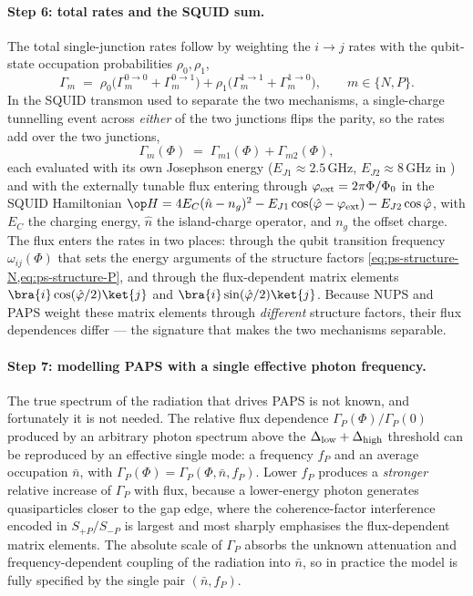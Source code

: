 \paragraph{Step 6: total rates and the SQUID sum.}
The total single-junction rates follow by weighting the $i\to j$
rates with the qubit-state occupation probabilities
$\rho_0,\rho_1$,
\begin{equation}
\label{eq:ps-total-single}
\Gamma_m \;=\; \rho_0\bigl(\Gamma_m^{0\to0}+\Gamma_m^{0\to1}\bigr)
+ \rho_1\bigl(\Gamma_m^{1\to1}+\Gamma_m^{1\to0}\bigr),
\qquad m\in\{N,P\}.
\end{equation}
In the SQUID transmon used to separate the two mechanisms, a
single-charge tunnelling event across \emph{either} of the two
junctions flips the parity, so the rates add over the two
junctions,
\begin{equation}
\label{eq:ps-squid-sum}
\Gamma_m(\Phi) \;=\; \Gamma_{m1}(\Phi) + \Gamma_{m2}(\Phi),
\end{equation}
each evaluated with its own Josephson energy
($E_{J1}\approx 2.5\,\text{GHz}$, $E_{J2}\approx 8\,\text{GHz}$ in
\cite{diamond2022}) and with the externally tunable flux entering
through $\varphi_{\rm ext}=2\pi\Phi/\Phi_0$ in the SQUID
Hamiltonian
$\op H = 4E_C(\hat n - n_g)^2 - E_{J1}\cos(\hat\varphi-\varphi_{\rm ext})
- E_{J2}\cos\hat\varphi$, with $E_C$ the charging energy, $\hat n$
the island-charge operator, and $n_g$ the offset charge. The flux
enters the rates in two places: through the qubit transition
frequency $\omega_{ij}(\Phi)$ that sets the energy arguments of the
structure factors
\cref{eq:ps-structure-N,eq:ps-structure-P}, and through the
flux-dependent matrix elements
$\bra{i}\cos(\hat\varphi/2)\ket{j}$ and
$\bra{i}\sin(\hat\varphi/2)\ket{j}$. Because NUPS and PAPS weight
these matrix elements through \emph{different} structure factors,
their flux dependences differ --- the signature that makes the two
mechanisms separable.

\paragraph{Step 7: modelling PAPS with a single effective photon frequency.}
The true spectrum of the radiation that drives PAPS is not known,
and fortunately it is not needed. The relative flux dependence
$\Gamma_P(\Phi)/\Gamma_P(0)$ produced by an arbitrary photon
spectrum above the $\Delta_{\rm low}+\Delta_{\rm high}$ threshold
can be reproduced by an effective single mode: a frequency $f_P$
and an average occupation $\bar n$, with
$\Gamma_P(\Phi)=\Gamma_P(\Phi,\bar n,f_P)$. Lower $f_P$ produces a
\emph{stronger} relative increase of $\Gamma_P$ with flux, because
a lower-energy photon generates quasiparticles closer to the gap
edge, where the coherence-factor interference encoded in
$S_{+P}/S_{-P}$ is largest and most sharply emphasises the
flux-dependent matrix elements. The absolute scale of $\Gamma_P$
absorbs the unknown attenuation and frequency-dependent coupling of
the radiation into $\bar n$, so in practice the model is fully
specified by the single pair $(\bar n,f_P)$.

